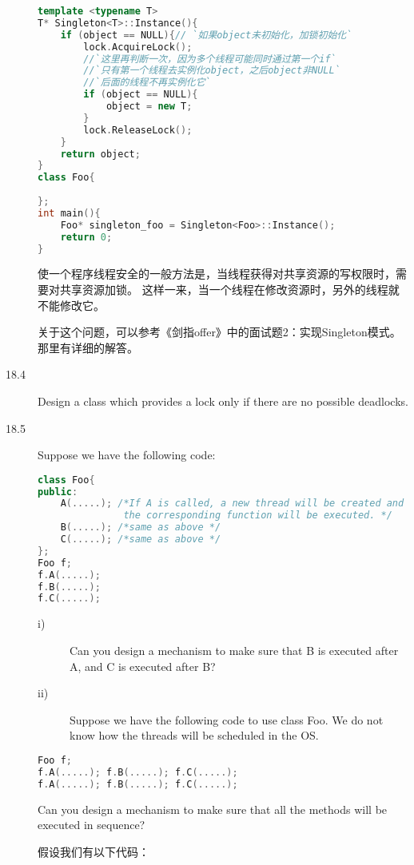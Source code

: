 \begin{description}
\begin{lstlisting}[language=C++]
template <typename T>
T* Singleton<T>::Instance(){
    if (object == NULL){// `如果object未初始化，加锁初始化`
        lock.AcquireLock();
        //`这里再判断一次，因为多个线程可能同时通过第一个if`
        //`只有第一个线程去实例化object，之后object非NULL`
        //`后面的线程不再实例化它`
        if (object == NULL){
            object = new T;
        }
        lock.ReleaseLock();
    }
    return object;
}
class Foo{
    
};
int main(){
    Foo* singleton_foo = Singleton<Foo>::Instance();
    return 0;
}
\end{lstlisting}
使一个程序线程安全的一般方法是，当线程获得对共享资源的写权限时，需要对共享资源加锁。 这样一来，当一个线程在修改资源时，另外的线程就不能修改它。

关于这个问题，可以参考《剑指offer》中的面试题2：实现Singleton模式。 那里有详细的解答。
%


\item[18.4] Design a class which provides a lock only if there are no possible deadlocks.
%


\item[18.5] Suppose we have the following code:
\begin{lstlisting}[language=C++]
class Foo{
public:
    A(.....); /*If A is called, a new thread will be created and
               the corresponding function will be executed. */
    B(.....); /*same as above */
    C(.....); /*same as above */
};
Foo f;
f.A(.....);
f.B(.....);
f.C(.....);
\end{lstlisting}
\begin{description}
\item[i)] Can you design a mechanism to make sure that B is executed after A, and C is executed after B?
\item[ii)] Suppose we have the following code to use class Foo. We do not know how the threads will be scheduled in the OS.
\end{description}
\begin{lstlisting}[language=C++]
Foo f;
f.A(.....); f.B(.....); f.C(.....); 
f.A(.....); f.B(.....); f.C(.....);
\end{lstlisting}
Can you design a mechanism to make sure that all the methods will be executed in sequence?

假设我们有以下代码：


\end{description}
